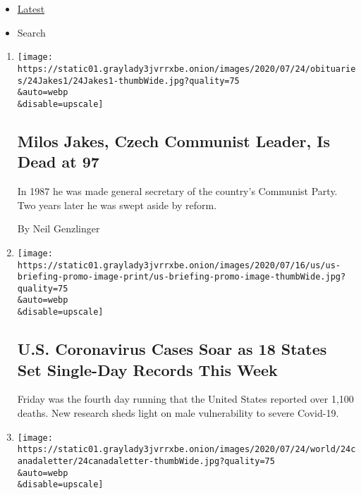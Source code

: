 \begin{itemize}
\tightlist
\item
  \protect\hyperlink{stream-panel}{Latest}
\item
  Search
\end{itemize}

\begin{enumerate}
\def\labelenumi{\arabic{enumi}.}
\item
  \href{/2020/07/25/world/europe/milos-jakes-dead.html}{}

  \texttt{[image: https://static01.graylady3jvrrxbe.onion/images/2020/07/24/obituaries/24Jakes1/24Jakes1-thumbWide.jpg?quality=75\\\&auto=webp\\\&disable=upscale]}

  \hypertarget{milos-jakes-czech-communist-leader-is-dead-at-97}{%
  \subsection{Milos Jakes, Czech Communist Leader, Is Dead at
  97}\label{milos-jakes-czech-communist-leader-is-dead-at-97}}

  In 1987 he was made general secretary of the country's Communist
  Party. Two years later he was swept aside by reform.

  By Neil Genzlinger
\item
  \href{/2020/07/25/world/coronavirus-covid-19.html}{}

  \texttt{[image: https://static01.graylady3jvrrxbe.onion/images/2020/07/16/us/us-briefing-promo-image-print/us-briefing-promo-image-thumbWide.jpg?quality=75\\\&auto=webp\\\&disable=upscale]}

  \hypertarget{us-coronavirus-cases-soar-as-18-states-set-single-day-records-this-week}{%
  \subsection{U.S. Coronavirus Cases Soar as 18 States Set Single-Day
  Records This
  Week}\label{us-coronavirus-cases-soar-as-18-states-set-single-day-records-this-week}}

  Friday was the fourth day running that the United States reported over
  1,100 deaths. New research sheds light on male vulnerability to severe
  Covid-19.
\item
  \href{/2020/07/24/world/canada/cronk.html}{}

  \texttt{[image: https://static01.graylady3jvrrxbe.onion/images/2020/07/24/world/24canadaletter/24canadaletter-thumbWide.jpg?quality=75\\\&auto=webp\\\&disable=upscale]}


\end{enumerate}
